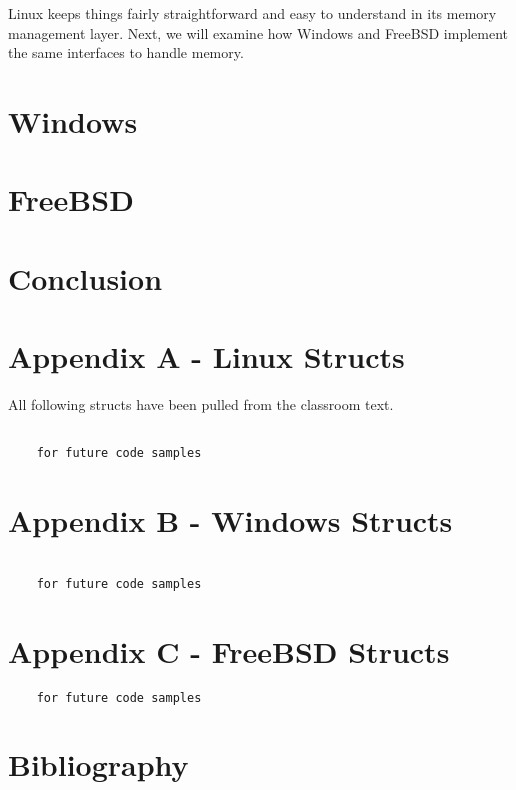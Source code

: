 \documentclass[10pt,letterpaper,onecolumn,draftclsnofoot]{IEEEtran}
\begin{document}
	Linux keeps things fairly straightforward and easy to understand in its
	memory management layer. Next, we will examine how Windows and FreeBSD
	implement the same interfaces to handle	memory.
  \section{Windows}
  \subsection{}
  \subsection{}
  \section{FreeBSD}
  \subsection{}
  \subsection{}
  \section{Conclusion}

  \clearpage
  \section{Appendix A - Linux Structs}
  All following structs have been pulled from the classroom text. \cite{robertlove2010}
  \begin{lstlisting}

    for future code samples

  \end{lstlisting}

  \section{Appendix B - Windows Structs}
  \begin{lstlisting}

    for future code samples
  \end{lstlisting}
  \section{Appendix C - FreeBSD Structs}
  \begin{lstlisting}
    for future code samples

  \end{lstlisting}

  \section{Bibliography}
  
  
\end{document}

